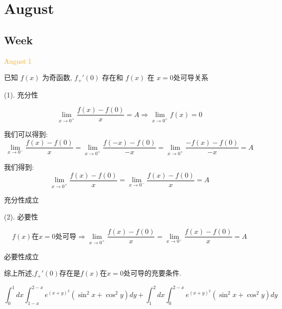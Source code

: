 \chapter{August}
\section{Week }
\textcolor{orange}{August 1}

\begin{example}[][Exam: 34.1.1]
	已知 $f(x)$ 为奇函数, $f_{+}'(0)$ 存在和 $f(x)$ 在 $x=0$处可导关系
\end{example}

\begin{solution}
	
	(1). 充分性
	
	$$\lim\limits_{x\to 0^{+}}\dfrac{f(x)-f(0)}{x}=A\Rightarrow \lim\limits_{x\to 0^{+}}f(x)=0$$
	
	我们可以得到: 
	$$\lim\limits_{x\to 0^{-}}\dfrac{f(x)-f(0)}{x}=\lim\limits_{x\to 0^{+}}\dfrac{f(-x)-f(0)}{-x}=\lim\limits_{x\to 0^{+}}\dfrac{-f(x)-f(0)}{-x}=A$$
	
	我们得到: $$\lim\limits_{x\to 0^{+}}\dfrac{f(x)-f(0)}{x}=\lim\limits_{x\to 0^{-}}\dfrac{f(x)-f(0)}{x}=A$$
	
	充分性成立
	
	(2). 必要性
	
	$$f(x)\text{在}x=0\text{处可导}\Rightarrow \lim\limits_{x\to 0^{+}}\dfrac{f(x)-f(0)}{x}=\lim\limits_{x\to 0^{-}}\dfrac{f(x)-f(0)}{x}=A$$
	
	必要性成立
	
	综上所述,$f_{+}'(0)$存在是$f(x)$在$x=0$处可导的充要条件.
\end{solution} 

\begin{example}[][Exam: 34.1.2]
	$$\int_{0}^{1}dx\int_{1-x}^{2-x}e^{(x+y)^2}(\sin^2x+\cos^2y)dy+\int_{1}^{2}dx\int_{0}^{2-x}e^{(x+y)^2}(\sin^2x+\cos^2y)dy$$
\end{example}

